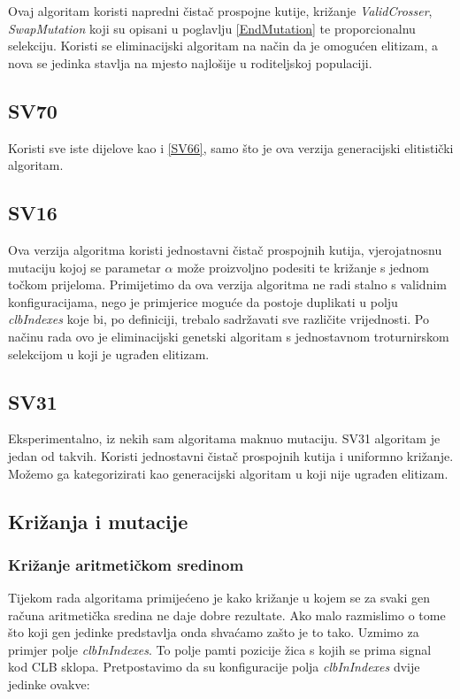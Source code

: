 \documentclass[times, utf8, zavrsni]{fer}
\begin{document}
	Ovaj algoritam koristi napredni čistač prospojne kutije, križanje \emph{ValidCrosser}, \emph{SwapMutation} koji su opisani u poglavlju \ref{EndMutation} te proporcionalnu selekciju. Koristi se eliminacijski algoritam na način da je omogućen elitizam, a nova se jedinka stavlja na mjesto najlošije u roditeljskoj populaciji.
	
	\subsection{SV70}
	\label{SV70}
	
	Koristi sve iste dijelove kao i \ref{SV66}, samo što je ova verzija generacijski elitistički algoritam.
	
	\subsection{SV16}
	\label{SV16}
	
	Ova verzija algoritma koristi jednostavni čistač prospojnih kutija, vjerojatnosnu mutaciju kojoj se parametar $\alpha$ može proizvoljno podesiti te križanje s jednom točkom prijeloma. Primijetimo da ova verzija algoritma ne radi stalno s validnim konfiguracijama, nego je primjerice moguće da postoje duplikati u polju \emph{clbIndexes} koje bi, po definiciji, trebalo sadržavati sve različite vrijednosti. Po načinu rada ovo je eliminacijski genetski algoritam s jednostavnom troturnirskom selekcijom u koji je ugrađen elitizam.  
	
	\subsection{SV31}
	
	Eksperimentalno, iz nekih sam algoritama maknuo mutaciju. SV31 algoritam je jedan od takvih. Koristi jednostavni čistač prospojnih kutija i uniformno križanje.
	Možemo ga kategorizirati kao generacijski algoritam u koji nije ugrađen elitizam. 
	
	
	
	\subsection{Križanja i mutacije}
	
	\subsubsection{Križanje aritmetičkom sredinom}
	
	
	Tijekom rada algoritama primijećeno je kako križanje u kojem se za svaki gen računa aritmetička sredina ne daje dobre rezultate. Ako malo razmislimo o tome što koji gen jedinke predstavlja onda shvaćamo zašto je to tako. Uzmimo za primjer polje \emph{clbInIndexes}. To polje pamti pozicije žica s kojih se prima signal kod CLB sklopa. Pretpostavimo da su konfiguracije polja \emph{clbInIndexes} dvije jedinke ovakve:
	
\end{document}
